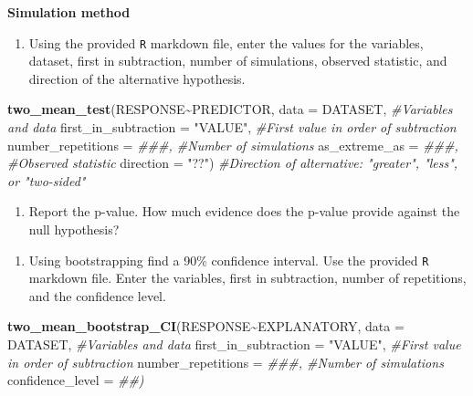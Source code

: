 \documentclass[
]{report}
\newenvironment{Shaded}{\begin{snugshade}}{\end{snugshade}}
\newcommand{\CommentTok}[1]{\textcolor[rgb]{0.56,0.35,0.01}{\textit{#1}}}
\newcommand{\DataTypeTok}[1]{\textcolor[rgb]{0.13,0.29,0.53}{#1}}
\newcommand{\KeywordTok}[1]{\textcolor[rgb]{0.13,0.29,0.53}{\textbf{#1}}}
\newcommand{\NormalTok}[1]{#1}
\newcommand{\OperatorTok}[1]{\textcolor[rgb]{0.81,0.36,0.00}{\textbf{#1}}}
\newcommand{\StringTok}[1]{\textcolor[rgb]{0.31,0.60,0.02}{#1}}
\providecommand{\tightlist}{%
  \setlength{\itemsep}{0pt}\setlength{\parskip}{0pt}}
\begin{document}
\textbf{Simulation method}

\begin{enumerate}
\def\labelenumi{\arabic{enumi}.}
\setcounter{enumi}{14}
\tightlist
\item
  Using the provided \texttt{R} markdown file, enter the values for the variables, dataset, first in subtraction, number of simulations, observed statistic, and direction of the alternative hypothesis.
\end{enumerate}

\begin{Shaded}
\begin{Highlighting}[]
\KeywordTok{two\_mean\_test}\NormalTok{(RESPONSE}\OperatorTok{\textasciitilde{}}\NormalTok{PREDICTOR, }\DataTypeTok{data =}\NormalTok{ DATASET,  }\CommentTok{\#Variables and data}
                    \DataTypeTok{first\_in\_subtraction =} \StringTok{"VALUE"}\NormalTok{, }\CommentTok{\#First value in order of subtraction}
                    \DataTypeTok{number\_repetitions =} \CommentTok{\#\#\#,  \#Number of simulations}
                    \DataTypeTok{as\_extreme\_as =} \CommentTok{\#\#\#,  \#Observed statistic}
                    \DataTypeTok{direction =} \StringTok{"??"}\NormalTok{)  }\CommentTok{\#Direction of alternative: "greater", "less", or "two{-}sided"}
\end{Highlighting}
\end{Shaded}

\vspace{1in}

\begin{enumerate}
\def\labelenumi{\arabic{enumi}.}
\setcounter{enumi}{15}
\tightlist
\item
  Report the p-value. How much evidence does the p-value provide against the null hypothesis?
\end{enumerate}

\vspace{1in}

\begin{enumerate}
\def\labelenumi{\arabic{enumi}.}
\setcounter{enumi}{16}
\tightlist
\item
  Using bootstrapping find a 90\% confidence interval. Use the provided \texttt{R} markdown file. Enter the variables, first in subtraction, number of repetitions, and the confidence level.
\end{enumerate}

\begin{Shaded}
\begin{Highlighting}[]
\KeywordTok{two\_mean\_bootstrap\_CI}\NormalTok{(RESPONSE}\OperatorTok{\textasciitilde{}}\NormalTok{EXPLANATORY, }\DataTypeTok{data =}\NormalTok{ DATASET,  }\CommentTok{\#Variables and data}
                      \DataTypeTok{first\_in\_subtraction =} \StringTok{"VALUE"}\NormalTok{, }\CommentTok{\#First value in order of subtraction}
                      \DataTypeTok{number\_repetitions =} \CommentTok{\#\#\#,  \#Number of simulations}
                      \DataTypeTok{confidence\_level =} \CommentTok{\#\#)}
\end{Highlighting}
\end{Shaded}
\end{document}
